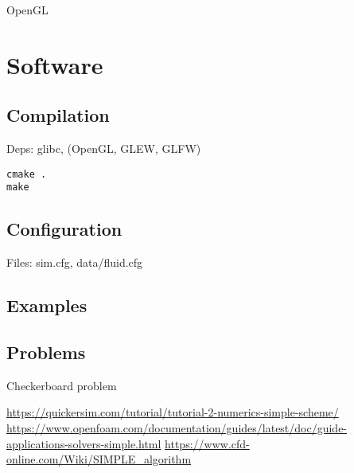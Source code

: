 \documentclass[12pt]{article}
\begin{document}
OpenGL

\section{Software}

\subsection{Compilation}

Deps: glibc, (OpenGL, GLEW, GLFW)

\begin{verbatim}
cmake .
make
\end{verbatim}

\subsection{Configuration}

Files: sim.cfg, data/fluid.cfg

\subsection{Examples}

\subsection{Problems}

Checkerboard problem

\begin{comment}
  Virtausdynamiikkasimulaattorin toteuttaminen ja soveltaminen nesteiden virtausprofiilien laskemiseen putkissa
\end{comment}

\begin{thebibliography}{9}

 \url{https://quickersim.com/tutorial/tutorial-2-numerics-simple-scheme/}
 \url{https://www.openfoam.com/documentation/guides/latest/doc/guide-applications-solvers-simple.html}
   \url{https://www.cfd-online.com/Wiki/SIMPLE_algorithm}

\end{thebibliography}
\end{document}
